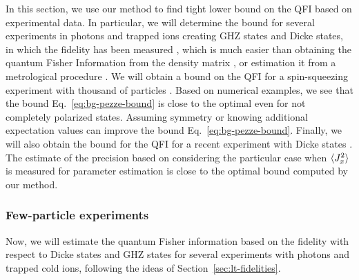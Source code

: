 In this section, we use our method to find tight lower bound on the QFI based on experimental data.
In particular, we will determine the bound for several experiments in photons and trapped ions creating GHZ states and Dicke states, in which the fidelity has been measured \citep{Krischek2011, Zhao2003, Gao2010, Leibfrid2004, Sackett2000, Monz2011, Kiesel2007, Wieczorek2009, Prevedel2009, Chiuri2012}, which is much easier than obtaining the quantum Fisher Information from the density matrix \citep{Hyllus2012}, or estimation it from a metrological procedure \citep{Luecke2011}.
We will obtain a bound on the QFI for a spin-squeezing experiment with thousand of particles \citep{Gross2010}.
Based on numerical examples, we see that the bound Eq.~\eqref{eq:bg-pezze-bound} is close to the optimal even for not completely polarized states.
Assuming symmetry or knowing additional expectation values can improve the bound Eq.~\eqref{eq:bg-pezze-bound}.
Finally, we will also obtain the bound for the QFI for a recent experiment with Dicke states \citep{Lucke2014}.
The estimate of the precision based on considering the particular case when $\langle J_x^2 \rangle$ is measured for parameter estimation \citep{Apellaniz2015} is close to the optimal bound computed by our method.

\subsubsection{Few-particle experiments}

Now, we will estimate the quantum Fisher information based on the fidelity with respect to Dicke states and GHZ states for several experiments with photons and trapped cold ions, following the ideas of Section~\ref{sec:lt-fidelities}.

